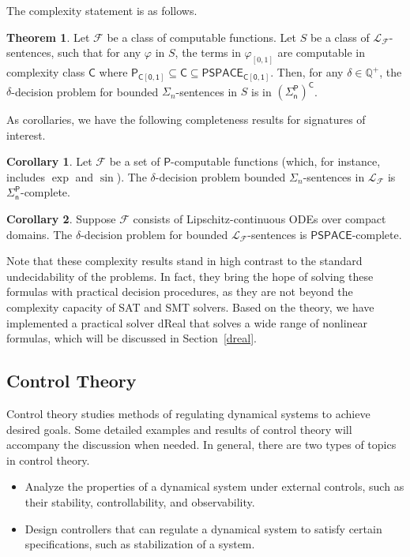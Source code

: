 \documentclass[10pt]{article}
\theoremstyle{definition}
\newtheorem{theorem}{Theorem}[section]
\newtheorem{corollary}{Corollary}[section]
\begin{document}
The complexity statement is as follows. 
\begin{theorem}\label{compmain}
Let $\mathcal{F}$ be a class of computable functions. Let $S$ be a class of $\mathcal{L}_{\mathcal{F}}$-sentences, such that for any $\varphi$ in $S$, the terms in $\varphi_{[0,1]}$ are computable in complexity class $\mathsf{C}$ where $\mathsf{P_{C[0,1]}\subseteq \mathsf{C}\subseteq \mathsf{PSPACE_{C[0,1]}}}$. Then, for any $\delta\in \mathbb{Q}^+$, the $\delta$-decision problem for bounded $\Sigma_n$-sentences in $S$ is in $\mathsf{(\Sigma_n^P)^C}$.
\end{theorem}
As corollaries, we have the following completeness results for signatures of interest. 
\begin{corollary}
Let $\mathcal{F}$ be a set of $\mathsf{P}$-computable functions (which, for instance, includes $\exp$ and $\sin$). The $\delta$-decision problem bounded $\Sigma_n$-sentences in $\mathcal{L}_{\mathcal{F}}$ is $\mathsf{\Sigma_n^P}$-complete. 
\end{corollary}
\begin{corollary}
Suppose $\mathcal{F}$ consists of Lipschitz-continuous ODEs over compact domains. The $\delta$-decision problem for bounded $\mathcal{L}_{\mathcal{F}}$-sentences is $\mathsf{PSPACE}$-complete. 
\end{corollary}
Note that these complexity results stand in high contrast to the standard undecidability of the problems. In fact, they bring the hope of solving these formulas with practical decision procedures, as they are not beyond the complexity capacity of SAT and SMT solvers. Based on the theory, we have implemented a practical solver dReal that solves a wide range of nonlinear formulas, which will be discussed in Section~\ref{dreal}. 

\subsection{Control Theory} 

Control theory studies methods of regulating dynamical systems to achieve desired goals. Some detailed examples and results of control theory will accompany the discussion when needed.
In general, there are two types of topics in control theory. 
\begin{itemize}
\item Analyze the properties of a dynamical system under external controls, such as their stability, controllability, and observability. 
\item Design controllers that can regulate a dynamical system to satisfy certain specifications, such as stabilization of a system. 
\end{itemize}
\end{document}
